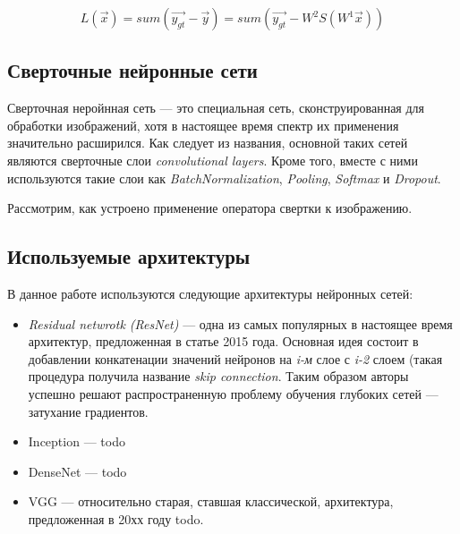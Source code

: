 \begin{equation}\label{eq:loss}
	   L(\vec{x}) = sum(\vec{y_{gt}} - \vec{y}) = sum(\vec{y_{gt}} - W^{2} S(W^{1} \vec{x}))
\end{equation}

 
 
\subsection{Сверточные нейронные сети}
\indent
\indent
Сверточная неройнная сеть --- это специальная сеть, сконструированная для 
обработки изображений, хотя в настоящее время спектр их применения 
значительно расширился. Как следует из названия, основной таких сетей 
являются сверточные слои \textit{convolutional layers}. 
Кроме того, вместе с ними используются такие
слои как \textit{BatchNormalization}, \textit{Pooling}, \textit{Softmax} и \textit{Dropout}.

\indent
\indent
Рассмотрим, как устроено применение оператора свертки к изображению.

\subsection{Используемые архитектуры}
\indent
\indent
В данное работе используются следующие архитектуры нейронных сетей:

\begin{itemize}

    \item \textit{Residual netwrotk (ResNet)} ---
    одна из самых популярных в настоящее время архитектур,
    предложенная в статье \cite{resnet} 2015 года.
    Основная идея состоит в добавлении конкатенации значений
    нейронов на \textit{i-м} слое с \textit{i-2} слоем (такая процедура
    получила название \textit{skip connection}. Таким образом авторы
    успешно решают распространенную проблему обучения глубоких сетей ---
    затухание градиентов.
    
    \item {Inception} --- todo
    
    \item {DenseNet} --- todo
    
    \item {VGG} --- относительно старая, ставшая классической, архитектура,
    предложенная в 20хх году todo.
    
\end{itemize}

